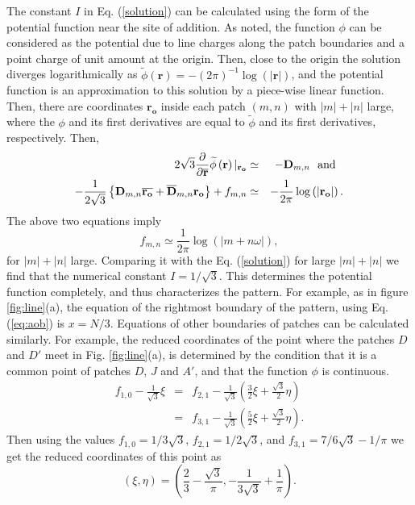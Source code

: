 \documentclass[11pt,a4paper]{book}
\begin{document}
The constant $I$ in Eq. (\ref{solution}) can be calculated using the form of the potential
function near the site of addition.
As noted, the function $\phi$ can be considered as the potential due to
line charges along the patch boundaries and a point
charge of unit amount at the origin. Then, close to the origin the
solution diverges logarithmically as $\widetilde{\phi}\left(
\mathbf{r}
\right)=-\left(2\pi\right)^{-1}\log\left( |\mathbf{r}| \right)$,
and the potential function is an approximation to this solution by a piece-wise linear function.
Then, there are coordinates $\mathbf{r_{o}}$ inside each patch $\left( m,n
\right)$ with $|m|+|n|$ large, where the $\phi$ and its first
derivatives are equal to $\tilde\phi$ and its first derivatives,
respectively. Then,
\begin{eqnarray}
2\sqrt{3}\frac{\partial}{\partial
\overline{\mathbf{r}}}\widetilde{\phi}\left( \mathbf{r}
\right)\vert_{\mathbf{r_{o}}}&\simeq&-\mathbf{D}_{m,n} \rm{~ ~ and ~ ~} \nonumber \\
-\frac{1}{2\sqrt{3}}\left\{
\mathbf{D}_{m,n}\overline{\mathbf{r_{o}}}+\overline{\mathbf{D}}_{m,n}\mathbf{r_{o}}
\right\}+f_{m,n}&\simeq&-\frac{1}{2\pi}\log\left( |\mathbf{r_{o}}|
\right).\nonumber\\
\end{eqnarray}
The above two equations imply
\begin{equation}
f_{m,n}\simeq\frac{1}{2\pi}\log\left( |m+n\omega| \right),
\label{logasymp}
\end{equation}
for $|m|+|n|$ large.
Comparing it with the Eq. (\ref{solution}) for large $|m|+|n|$ we find
that the numerical constant $I=1/\sqrt{3}$. This determines the potential function completely, and thus
characterizes the pattern. For example, as in figure
\ref{fig:line}(a), the equation of the rightmost boundary of the
pattern, using Eq. (\ref{eq:aob}) is $x=N/3$. Equations of other boundaries
of patches can be calculated similarly. For example, the reduced
coordinates of the point where the patches $D$ and $D'$ meet in Fig.
\ref{fig:line}(a), is determined by the condition that it is a
common point of patches $D$, $J$ and $A'$, and that the function
$\phi$ is continuous.
\begin{eqnarray}
f_{1,0}-\frac{1}{\sqrt{3}}\xi &=& f_{2,1}-\frac{1}{\sqrt{3}}\left( \frac{3}{2}\xi +
\frac{\sqrt{3}}{2}\eta \right) \nonumber \\
&=& f_{3,1}-\frac{1}{\sqrt{3}}\left( \frac{5}{2}\xi +
\frac{\sqrt{3}}{2}\eta \right).
\end{eqnarray}
Then using the values $f_{1,0}=1/3\sqrt{3}$, $f_{2,1}=
1/2\sqrt{3}$, and
$f_{3,1}=7/6\sqrt{3}-1/\pi$ \cite{atkinson} we get the reduced coordinates of this point as 
\begin{equation}
\left(\xi,\eta\right) =
\left(\frac{2}{3}-\frac{\sqrt{3}}{\pi},-\frac{1}{3\sqrt{3}}+\frac{1}{\pi}\right).
\end{equation}
\end{document}
